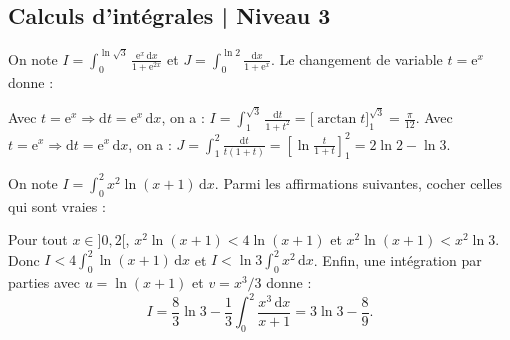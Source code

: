 \subsection{Calculs d'intégrales | Niveau 3}

\begin{question}
On note $\displaystyle I=\int _{0}^{\ln \sqrt{3}}\frac{\mathrm{e}^x\, \mathrm{d}x}{1+\mathrm{e}^{2x}}$ et $\displaystyle J=\int _{0}^{\ln 2}\frac{\mathrm{d}x}{1+\mathrm{e}^{x}}$. Le changement de variable $t=\mathrm{e}^x$ donne :
\begin{answers}  
\end{answers}
\vskip3mm
\begin{explanations}
Avec $t=\mathrm{e}^x\Rightarrow \mathrm{d}t=\mathrm{e}^x\, \mathrm{d}x$, on a : $\displaystyle I=\int _1^{\sqrt{3}}\frac{\mathrm{d}t}{1+t^2}=\Big[\arctan t\Big]_1^{\sqrt{3}}=\frac{\pi}{12}$.
\vskip0mm
Avec $t=\mathrm{e}^x\Rightarrow \mathrm{d}t=\mathrm{e}^x\, \mathrm{d}x$, on a : $\displaystyle J=\int _1^{2}\frac{\mathrm{d}t}{t(1+t)}=\left[\ln \frac{t}{1+t}\right]_1^{2}=2\ln 2-\ln 3$.
\end{explanations}
\end{question}

\begin{question}
On note $\displaystyle I=\int _{0}^{2}x^2\ln (x+1)\, \mathrm{d}x$. Parmi les affirmations suivantes, cocher celles qui sont vraies :
\begin{answers}  
\end{answers}
\vskip3mm
\begin{explanations}
Pour tout $x\in ]0,2[$, $x^2\ln (x+1)< 4\ln (x+1)$ et $x^2\ln (x+1)<x^2\ln 3$. Donc $\displaystyle I<4\int _{0}^{2}\ln (x+1)\, \mathrm{d}x$ et $\displaystyle I<\ln 3\int _{0}^{2}x^2\, \mathrm{d}x$. Enfin, une intégration par parties avec $u=\ln (x+1)$ et $v=x^3/3$ donne :
$$I=\frac{8}{3}\ln 3-\frac{1}{3}\int _{0}^{2}\frac{x^3\, \mathrm{d}x}{x+1}=3\ln 3-\frac{8}{9}.$$
\end{explanations}
\end{question}

